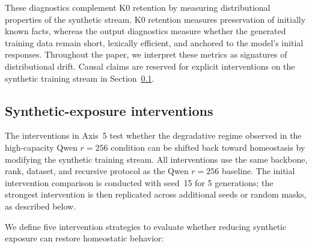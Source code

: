 \documentclass[a4paper,fleqn]{cas-dc}
\begin{document}
These diagnostics complement K0 retention by measuring distributional properties
of the synthetic stream. K0 retention measures preservation of initially known
facts, whereas the output diagnostics measure whether the generated training
data remain short, lexically efficient, and anchored to the model's initial
responses. Throughout the paper, we interpret these metrics as signatures of
distributional drift. Causal claims are reserved for explicit interventions on
the synthetic training stream in Section~\ref{sec:intervention}.

\subsection{Synthetic-exposure interventions}\label{sec:intervention}

The interventions in Axis~5 test whether the degradative regime observed in the
high-capacity Qwen $r=256$ condition can be shifted back toward homeostasis by
modifying the synthetic training stream. All interventions use the same backbone,
rank, dataset, and recursive protocol as the Qwen $r=256$ baseline. The initial
intervention comparison is conducted with seed~15 for 5 generations; the
strongest intervention is then replicated across additional seeds or random
masks, as described below.

We define five intervention strategies to evaluate whether reducing synthetic
exposure can restore homeostatic behavior:
\end{document}

